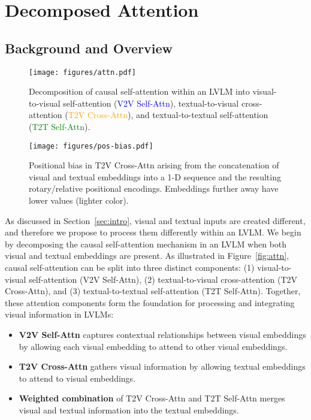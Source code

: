 \section{Decomposed Attention}\label{sec:method}

\subsection{Background and Overview}\label{sec:background}

\begin{figure}[t]
\begin{minipage}[b]{0.48\linewidth}
    \centering
    \texttt{[image: figures/attn.pdf]}
    \caption{Decomposition of causal self-attention within an LVLM into visual-to-visual self-attention (\textcolor{blue}{V2V Self-Attn}), textual-to-visual cross-attention (\textcolor{orange}{T2V Cross-Attn}), and textual-to-textual self-attention (\textcolor{green}{T2T Self-Attn}).}\label{fig:attn}
\end{minipage}
\hfill
\begin{minipage}[b]{0.48\linewidth}
    \centering
    \texttt{[image: figures/pos-bias.pdf]}
    \caption{Positional bias in T2V Cross-Attn arising from the concatenation of visual and textual embeddings into a 1-D sequence and the resulting rotary/relative positional encodings. Embeddings further away have lower values (lighter color).}\label{fig:pos-bias}
\end{minipage}
\end{figure}

As discussed in Section~\ref{sec:intro}, visual and textual inputs are created different, and therefore we propose to process them differently within an LVLM.
We begin by decomposing the causal self-attention mechanism in an LVLM when both visual and textual embeddings are present.
As illustrated in Figure~\ref{fig:attn}, causal self-attention can be split into three distinct components: (1) visual-to-visual self-attention (V2V Self-Attn), (2) textual-to-visual cross-attention (T2V Cross-Attn), and (3) textual-to-textual self-attention (T2T Self-Attn).
Together, these attention components form the foundation for processing and integrating visual information in LVLMs:
\begin{itemize}[wide,labelindent=0pt]
\item \textbf{V2V Self-Attn} captures contextual relationships between visual embeddings by allowing each visual embedding to attend to other visual embeddings.
\item \textbf{T2V Cross-Attn} gathers visual information by allowing textual embeddings to attend to visual embeddings.
\item \textbf{Weighted combination} of T2V Cross-Attn and T2T Self-Attn merges visual and textual information into the textual embeddings.
\end{itemize}


